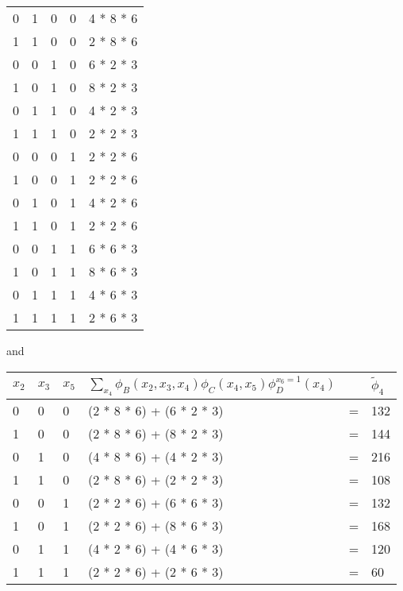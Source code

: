 \begin{exenumerate}
\begin{solution}
\begin{center}
\begin{tabular}{lllll}
        0 & 1 & 0 & 0 & 4 * 8 * 6 \\
        1 & 1 & 0 & 0 & 2 * 8 * 6 \\
        0 & 0 & 1 & 0 & 6 * 2 * 3\\
        1 & 0 & 1 & 0 & 8 * 2 * 3\\
        0 & 1 & 1 & 0 & 4 * 2 * 3\\
        1 & 1 & 1 & 0 & 2 * 2 * 3\\
        0 & 0 & 0 & 1 & 2 * 2 * 6\\
        1 & 0 & 0 & 1 & 2 * 2 * 6\\
        0 & 1 & 0 & 1 & 4 * 2 * 6\\
        1 & 1 & 0 & 1 & 2 * 2 * 6\\
        0 & 0 & 1 & 1 & 6 * 6 * 3\\
        1 & 0 & 1 & 1 & 8 * 6 * 3\\
        0 & 1 & 1 & 1 & 4 * 6 * 3\\
        1 & 1 & 1 & 1 & 2 * 6 * 3\\
        \bottomrule
      \end{tabular}
    \end{center}
and
    \begin{center}
      \begin{tabular}{llllll}
        \toprule
        $x_2$ & $x_3$ & $x_5$ & $\sum_{x_4} \phi_B(x_2, x_3, x_4) \phi_C(x_4, x_5) \phi_D^{x_6=1}(x_4)$ &  & $\tilde{\phi}_4$\\
        \midrule
        0 & 0 & 0 & (2 * 8 * 6) + (6 * 2 * 3) & = & 132 \\
        1 & 0 & 0 & (2 * 8 * 6) + (8 * 2 * 3) & = & 144 \\
        0 & 1 & 0 & (4 * 8 * 6) + (4 * 2 * 3) & = & 216 \\
        1 & 1 & 0 & (2 * 8 * 6) + (2 * 2 * 3) & = & 108 \\
        0 & 0 & 1 & (2 * 2 * 6) + (6 * 6 * 3) & = & 132 \\
        1 & 0 & 1 & (2 * 2 * 6) + (8 * 6 * 3) & = & 168 \\
        0 & 1 & 1 & (4 * 2 * 6) + (4 * 6 * 3) & = & 120 \\
        1 & 1 & 1 & (2 * 2 * 6) + (2 * 6 * 3) & = & 60 \\
        \bottomrule
      \end{tabular}
    \end{center}


\end{solution}
\end{exenumerate}
